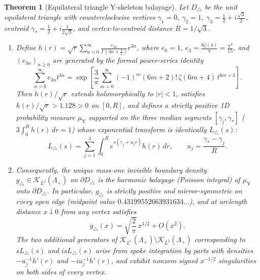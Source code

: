 \documentclass[11pt,reqno]{amsart}
\newtheorem{theorem}{Theorem}[section]
\theoremstyle{definition}
\theoremstyle{remark}
\begin{document}
\begin{theorem}[Equilateral triangle Y-skeleton balayage]\label{thm:triangle-skeleton}
Let $D_\triangle$ be the unit equilateral triangle with counterclockwise vertices $\gamma_1 = 0$, $\gamma_2 = 1$, $\gamma_3 = \frac12 + i\frac{\sqrt 3}{2}$, centroid $\gamma_* = \frac12 + i\frac{1}{2\sqrt 3}$, and vertex-to-centroid distance $R = 1/\sqrt 3$.
\begin{enumerate}
  \item Define $h(r) = \sqrt{r} \sum_{n=0}^\infty \frac{e_{3n}}{\Gamma(3n + \frac32)} r^{3n}$, where $e_0 = 1$, $e_3 = \frac{6\zeta(4)}{\pi} = \frac{\pi^3}{15}$, and $(e_{3n})_{n\ge 0}$ are generated by the formal power-series identity
  \begin{equation}\label{eq:zeta-skeleton}
    \sum_{n=0}^\infty e_{3n} t^{3n}
    = \exp\!\left[\frac{3}{\pi}\sum_{m=0}^\infty (-1)^m (6m+2)!\,\zeta(6m+4)\, t^{6m+3}\right].
  \end{equation}
  Then $h(r)/\sqrt{r}$ extends holomorphically to $|r| < 1$, satisfies $h(r)/\sqrt{r} > 1.128 > 0$ on $[0, R]$, and defines a strictly positive 1D probability measure $\mu_{\mathrm{Y}}$ supported on the three median segments $[\gamma_j, \gamma_*]$ ($3\int_0^R h(r)\,dr = 1$) whose exponential transform is identically $L_\triangle(s)$:
  \begin{equation}\label{eq:Y-transform}
    L_\triangle(s) = \sum_{j=1}^3 \int_0^R e^{s(\gamma_j + u_j r)} h(r)\,dr, \qquad u_j = \frac{\gamma_* - \gamma_j}{R}.
  \end{equation}
  \item Consequently, the unique mass-one invisible boundary density $g_\triangle \in \mathcal{K}_{L^2}(\Lambda_+)$ on $\partial D_\triangle$ is the harmonic balayage (Poisson integral) of $\mu_{\mathrm{Y}}$ onto $\partial D_\triangle$. In particular, $g_\triangle$ is strictly positive and mirror-symmetric on every open edge (midpoint value $0.43199552663931634\dots$), and at arclength distance $x \downarrow 0$ from any vertex satisfies
  \begin{equation}\label{eq:g-tri-corner}
    g_\triangle(x) = \sqrt{\frac{2}{\pi}}\, x^{1/2} + O(x^2).
  \end{equation}
  The two additional generators of $\mathcal{K}_{L^1}(\Lambda_+) \setminus \mathcal{K}_{L^2}(\Lambda_+)$ corresponding to $s L_\triangle(s)$ and $i s L_\triangle(s)$ arise from spoke integration by parts with densities $-u_j^{-1} h'(r)$ and $-i u_j^{-1} h'(r)$, and exhibit nonzero signed $x^{-1/2}$ singularities on both sides of every vertex.
\end{enumerate}
\end{theorem}
\end{document}
